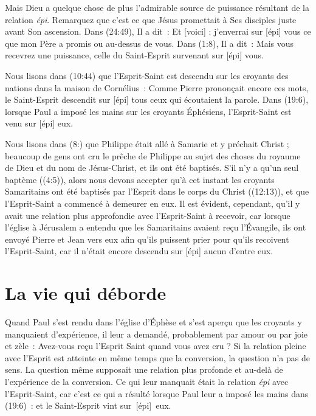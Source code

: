 Mais Dieu a quelque chose de plus \ocadr l'admirable source de puissance
 résultant de la relation \emph{épi}.
 Remarquez que c'est ce que Jésus promettait à Ses disciples juste avant
 Son ascension. Dans (24:49), Il a dit~:
 \og Et [voici] : j'enverrai sur [épi] vous ce que mon Père a promis \fg{} ou
 \og au-dessus de vous. \fg{}
 Dans (1:8), Il a dit~:
 \og Mais vous recevrez une puissance, celle du Saint-Esprit survenant
 sur [épi] vous. \fg{}

Nous lisons dans (10:44) que l'Esprit-Saint est descendu
 \og sur \fg{} les croyants des nations dans la maison de Cornélius~:
 \og Com\-me Pierre prononçait encore ces mots, le Saint-Esprit descendit
 sur [épi] tous ceux qui écoutaient la parole. \fg{}
 Dans (19:6), lorsque Paul a imposé les mains sur les
 croyants Éphésiens, l'Esprit-Saint est venu sur [épi] eux.

Nous lisons dans (8:) que Philippe était allé à Samarie
 et y préchait Christ ; beaucoup de gens ont cru le prêche de Philippe
 au sujet des choses du royaume de Dieu et du nom de Jésus-Christ,
 et ils ont été baptisés.
 S'il n'y a qu'un seul baptème ((4:5)),
 alors nous devons accepter qu'à cet instant les croyants Samaritains
 ont été baptisés par l'Esprit dans le corps du Christ
 ((12:13)), et que l'Esprit-Saint a commencé à demeurer
 en eux. Il est évident, cependant, qu'il y avait une relation plus approfondie
 avec l'Esprit-Saint à recevoir, car lorsque l'église à Jérusalem a entendu
 que les Samaritains avaient reçu l'Évangile, ils ont envoyé Pierre et Jean
 vers eux afin qu'ils puissent prier pour qu'ils recoivent l'Esprit-Saint,
 car il n'était encore descendu sur [épi] aucun d'entre eux.

\section{La vie qui d\'eborde}

Quand Paul s'est rendu dans l'église d'Éphèse et s'est aperçu
 que les croyants y manquaient d'expérience, 
 il leur a demandé,
 probablement par amour ou par joie et zèle~:
 \og Avez-vous reçu l'Esprit Saint quand vous avez cru ? \fg{}
 Si la relation pleine avec l'Esprit est atteinte en même temps
 que la conversion, la question n'a pas de sens.
 La question même supposait une relation plus profonde et au-delà
 de l'expérience  de la conversion.
 Ce qui leur manquait était la relation
 \emph{épi} avec l'Es\-prit-Saint, car c'est ce qui a résulté lorsque
 Paul leur a imposé les mains dans (19:6)~:
 \og et le Saint-Esprit vint sur~[épi]~eux. \fg{}

